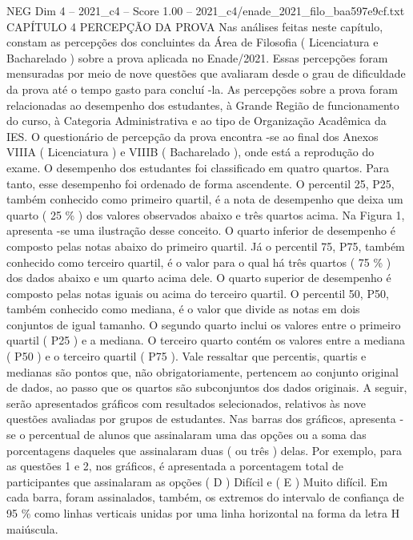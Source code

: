 \begin{textsample}{NEG Dim 4 – 2021\_c4 – Score 1.00 – 2021\_c4/enade\_2021\_filo\_baa597e9cf.txt}  \label{ex:f4_neg_224}
CAPÍTULO 4 PERCEPÇÃO DA PROVA Nas análises feitas neste capítulo, constam as percepções dos concluintes da Área de Filosofia ( Licenciatura e Bacharelado ) sobre a prova aplicada no Enade/2021.
Essas percepções foram mensuradas por meio de nove questões que avaliaram desde o grau de dificuldade da prova até o tempo gasto para concluí -la.
As percepções sobre a prova foram relacionadas ao desempenho dos estudantes, à Grande Região de funcionamento do curso, à Categoria Administrativa e ao tipo de Organização Acadêmica da IES.
O questionário de percepção da prova encontra -se ao final dos Anexos VIIIA ( Licenciatura ) e VIIIB ( Bacharelado ), onde está a reprodução do exame.
O desempenho dos estudantes foi classificado em quatro quartos.
Para tanto, esse desempenho foi ordenado de forma ascendente.
O percentil 25, P25, também conhecido como primeiro quartil, é a nota de desempenho que deixa um quarto ( 25 \% ) dos valores observados abaixo e três quartos acima.
Na Figura 1, apresenta -se uma ilustração desse conceito.
O quarto inferior de desempenho é composto pelas notas abaixo do primeiro quartil.
Já o percentil 75, P75, também conhecido como terceiro quartil, é o valor para o qual há três quartos ( 75 \% ) dos dados abaixo e um quarto acima dele.
O quarto superior de desempenho é composto pelas notas iguais ou acima do terceiro quartil.
O percentil 50, P50, também conhecido como mediana, é o valor que divide as notas em dois conjuntos de igual tamanho.
O segundo quarto inclui os valores entre o primeiro quartil ( P25 ) e a mediana.
O terceiro quarto contém os valores entre a mediana ( P50 ) e o terceiro quartil ( P75 ).
Vale ressaltar que percentis, quartis e medianas são pontos que, não obrigatoriamente, pertencem ao conjunto original de dados, ao passo que os quartos são subconjuntos dos dados originais.
A seguir, serão apresentados gráficos com resultados selecionados, relativos às nove questões avaliadas por grupos de estudantes.
Nas barras dos gráficos, apresenta -se o percentual de alunos que assinalaram uma das opções ou a soma das porcentagens daqueles que assinalaram duas ( ou três ) delas.
Por exemplo, para as questões 1 e 2, nos gráficos, é apresentada a porcentagem total de participantes que assinalaram as opções ( D ) Difícil e ( E ) Muito difícil.
Em cada barra, foram assinalados, também, os extremos do intervalo de confiança de 95 \% como linhas verticais unidas por uma linha horizontal na forma da letra H maiúscula.

\end{textsample}

